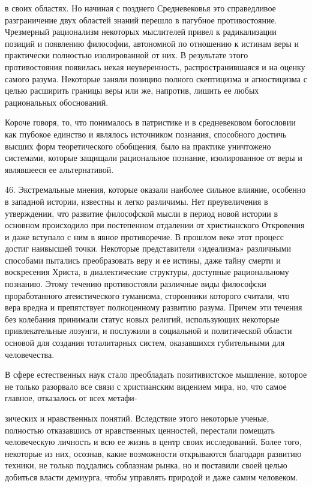 \documentclass[a5paper,10pt]{article}
\begin{document}
в своих областях. Но начиная с позднего Средневековья это справедливое
разграничение двух областей знаний перешло в пагубное противостояние.
Чрезмерный рационализм некоторых мыслителей привел к радикализации позиций и
появлению философии, автономной по отношению к истинам веры и практически
полностью изолированной от них. В результате этого противостояния появилась
некая неуверенность, распространившаяся и на оценку самого разума. Некоторые
заняли позицию полного скептицизма и агностицизма с целью расширить границы
веры или же, напротив, лишить ее любых рациональных обоснований.

Короче говоря, то, что понималось в патристике и в средневековом богословии как
глубокое единство и являлось источником познания, способного достичь высших
форм теоретического обобщения, было на практике уничтожено системами, которые
защищали рациональное познание, изолированное от веры и являвшееся ее
альтернативой.

46. Экстремальные мнения, которые оказали наиболее сильное влияние, особенно в
западной истории, известны и легко различимы. Нет преувеличения в утверждении,
что развитие философской мысли в период новой истории в основном происходило
при постепенном отдалении от христианского Откровения и даже вступало с ним в
явное противоречие. В прошлом веке этот процесс достиг наивысшей точки.
Некоторые представители «идеализма» различными способами пытались преобразовать
веру и ее истины, даже тайну смерти и воскресения Христа, в диалектические
структуры, доступные рациональному познанию. Этому течению противостояли
различные виды философски проработанного атеистического гуманизма, сторонники
которого считали, что вера вредна и препятствует полноценному развитию разума.
Причем эти течения без колебания принимали статус новых религий, использующих
некоторые привлекательные лозунги, и послужили в социальной и политической
области основой для создания тоталитарных систем, оказавшихся губительными для
человечества.

В сфере естественных наук стало преобладать позитивистское мышление, которое не
только разорвало все связи с христианским видением мира, но, что самое главное,
отказалось от всех метафи-

зических и нравственных понятий. Вследствие этого некоторые ученые, полностью
отказавшись от нравственных ценностей, перестали помещать человеческую личность
и всю ее жизнь в центр своих исследований. Более того, некоторые из них,
осознав, какие возможности открываются благодаря развитию техники, не только
поддались соблазнам рынка, но и поставили своей целью добиться власти демиурга,
чтобы управлять природой и даже самим человеком.
\end{document}

